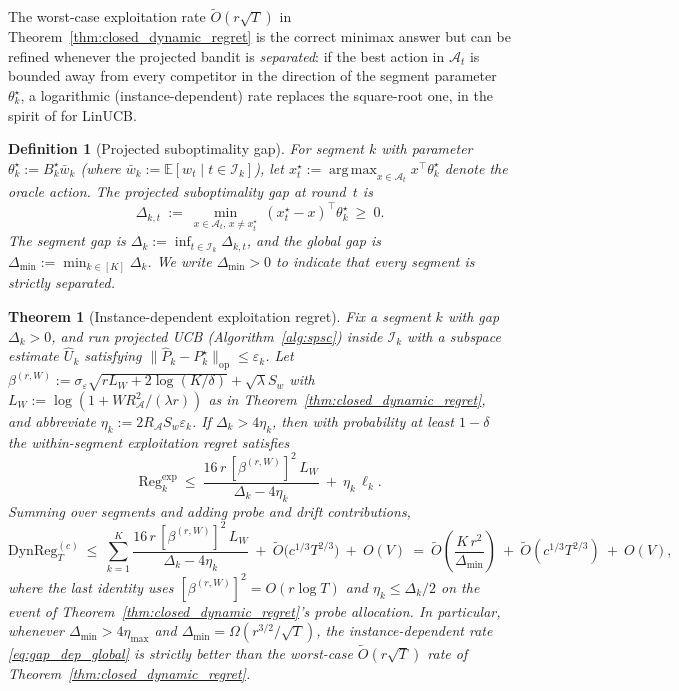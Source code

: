 \documentclass[11pt]{article}
\newcommand{\E}{\mathbb{E}}
\newcommand{\op}{\mathrm{op}}
\newcommand{\cA}{\mathcal{A}}
\newcommand{\cI}{\mathcal{I}}
\newcommand{\DynReg}{\mathrm{DynReg}}
\DeclareMathOperator*{\argmax}{arg\,max}
\newtheorem{definition}{Definition}
\newtheorem{theorem}{Theorem}
\begin{document}
The worst-case exploitation rate $\widetilde O(r\sqrt T)$ in
Theorem~\ref{thm:closed_dynamic_regret} is the correct minimax answer but
can be refined whenever the projected bandit is \emph{separated}:
if the best action in $\cA_t$ is bounded away from every competitor in
the direction of the segment parameter $\theta_k^\star$, a logarithmic
(instance-dependent) rate replaces the square-root one, in the spirit of
\citet{abbasi2011improved} for LinUCB.

\begin{definition}[Projected suboptimality gap]
\label{def:projected_gap}
For segment $k$ with parameter $\theta_k^\star:=B_k^\star\bar{w}_k$
(where $\bar{w}_k:=\E[w_t\mid t\in\cI_k]$), let
$x_t^\star:=\argmax_{x\in\cA_t}x^\top\theta_k^\star$ denote the
oracle action.  The \emph{projected suboptimality gap} at round~$t$ is
\[
  \Delta_{k,t}\ :=\
  \min_{x\in\cA_t,\, x\neq x_t^\star}\ (x_t^\star-x)^\top\theta_k^\star
  \ \ge\ 0.
\]
The segment gap is $\Delta_k:=\inf_{t\in\cI_k}\Delta_{k,t}$, and the
global gap is $\Delta_{\min}:=\min_{k\in[K]}\Delta_k$.  We write
$\Delta_{\min}>0$ to indicate that every segment is strictly separated.
\end{definition}

\begin{theorem}[Instance-dependent exploitation regret]
\label{thm:gap_dependent_exploitation}
Fix a segment $k$ with gap $\Delta_k>0$, and run projected UCB
(Algorithm~\ref{alg:spsc}) inside $\cI_k$ with a subspace estimate
$\widehat U_k$ satisfying
$\|\widehat P_k-P_k^\star\|_{\op}\le\varepsilon_k$.
Let
$\beta^{(r,W)}:=\sigma_\varepsilon\sqrt{rL_W+2\log(K/\delta)}+\sqrt\lambda S_w$
with $L_W:=\log(1+WR_{\cA}^2/(\lambda r))$ as in
Theorem~\ref{thm:closed_dynamic_regret}, and abbreviate
$\eta_k:=2R_{\cA}S_w\varepsilon_k$.
If $\Delta_k>4\eta_k$, then with probability at least $1-\delta$
the within-segment exploitation regret satisfies
\begin{equation}
\mathrm{Reg}_k^{\mathrm{exp}}
\ \le\
\frac{16\,r\,[\beta^{(r,W)}]^2\,L_W}{\Delta_k-4\eta_k}
\ +\ \eta_k\,\ell_k.
\label{eq:gap_dep_segment}
\end{equation}
Summing over segments and adding probe and drift contributions,
\begin{equation}
\DynReg_T^{(c)}
\ \le\
\sum_{k=1}^{K}\frac{16\,r\,[\beta^{(r,W)}]^2\,L_W}{\Delta_k-4\eta_k}
\ +\ \widetilde{O}\!\bigl(c^{1/3}T^{2/3}\bigr)\ +\ O(V)
\ =\ \widetilde{O}\!\left(\frac{K\,r^2}{\Delta_{\min}}\right)
\ +\ \widetilde{O}(c^{1/3}T^{2/3})\ +\ O(V),
\label{eq:gap_dep_global}
\end{equation}
where the last identity uses
$[\beta^{(r,W)}]^2=O(r\log T)$ and $\eta_k\le\Delta_k/2$ on the
event of Theorem~\ref{thm:closed_dynamic_regret}'s probe allocation.
In particular, whenever $\Delta_{\min}>4\eta_{\max}$ and
$\Delta_{\min}=\Omega(r^{3/2}/\sqrt T)$, the instance-dependent rate
\eqref{eq:gap_dep_global} is strictly better than the worst-case
$\widetilde O(r\sqrt T)$ rate of
Theorem~\ref{thm:closed_dynamic_regret}.
\end{theorem}
\end{document}
